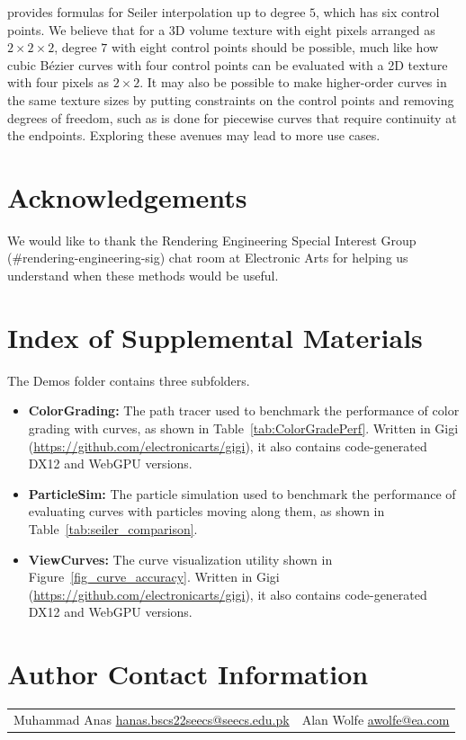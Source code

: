 \documentclass{jcgt}
\begin{document}
\citet{10.1145/3641233.3664331} provides formulas for Seiler interpolation up to degree $5$, which has six control points. We believe that for a 3D volume texture with eight pixels arranged as $2 \times 2 \times 2$, degree
$7$ with eight control points should be possible, much like how cubic Bézier curves with four control points can be evaluated with a 2D texture with four pixels as $2 \times 2$. It may also be possible
to make higher-order curves in the same texture sizes by putting constraints on the control points and removing degrees of freedom, such as is done for piecewise curves that require
continuity at the endpoints. Exploring these avenues may lead to more use cases.

\section*{Acknowledgements}

We would like to thank the Rendering Engineering Special Interest Group (\#rendering-engineering-sig) chat room at Electronic Arts for helping us understand when these methods
would be useful.

\section*{Index of Supplemental Materials}

The Demos folder contains three subfolders.
\begin{itemize}
    \item \textbf{ColorGrading:} The path tracer used to benchmark the performance of color grading with curves, as shown in Table~\ref{tab:ColorGradePerf}. Written in Gigi (\url{https://github.com/electronicarts/gigi}), it also contains code-generated DX12 and WebGPU versions.
    \item \textbf{ParticleSim:} The particle simulation used to benchmark the performance of evaluating curves with particles moving along them, as shown in Table~\ref{tab:seiler_comparison}.
    \item \textbf{ViewCurves:} The curve visualization utility shown in Figure~\ref{fig_curve_accuracy}. Written in Gigi (\url{https://github.com/electronicarts/gigi}), it also contains code-generated DX12 and WebGPU versions.
\end{itemize}

\small




\section*{Author Contact Information}

\hspace{-2mm}\begin{tabular}{p{}p{}}
Muhammad Anas \newline
\href{mailto:hanas.bscs22seecs@seecs.edu.pk}{hanas.bscs22seecs@seecs.edu.pk}
&

Alan Wolfe \newline
\href{mailto:awolfe@ea.com}{awolfe@ea.com}

\end{tabular}


\afterdoc
\end{document}
